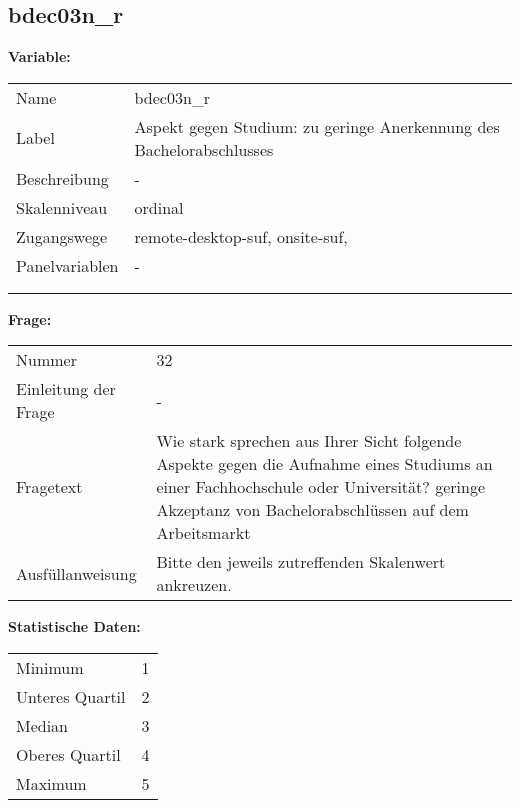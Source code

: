 	
	
	\subsection{bdec03n\_r}
	\label{subSection:bdec03n_r}

	\noindent\textbf{Variable:}\\
		\begin{tabular}{lL{11.3cm}}
			\label{tableVariable:bdec03n_r}
			Name & bdec03n\_r \\
			Label & Aspekt gegen Studium: zu geringe Anerkennung des Bachelorabschlusses \\
			Beschreibung & - \\
			Skalenniveau & ordinal \\
			Zugangswege &
				remote-desktop-suf,
				onsite-suf,
 \\
			Panelvariablen & -
			 \\
			 \\
 \\
		\end{tabular}

		\vspace*{1 cm}
		\noindent\textbf{Frage:}\\
		\begin{tabular}{lL{11.3cm}}
			\label{tableQuestion:bdec03n_r}
			Nummer & 32 \\
			Einleitung der Frage & - \\
			Fragetext & Wie stark sprechen aus Ihrer Sicht folgende Aspekte gegen die Aufnahme eines Studiums an einer Fachhochschule oder Universität?
geringe Akzeptanz von Bachelorabschlüssen auf dem Arbeitsmarkt \\
			Ausfüllanweisung & Bitte den jeweils zutreffenden Skalenwert ankreuzen. \\
		\end{tabular}


		\vspace*{1 cm}
		\noindent\textbf{Statistische Daten:}\\
			\begin{tabular}{ll}
				\label{tableStatistics:bdec03n_r}
					Minimum & 1 \\
					Unteres Quartil & 2 \\
					Median & 3 \\
					Oberes Quartil & 4 \\
					Maximum & 5 \\
			\end{tabular}



